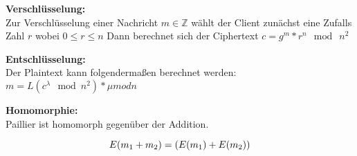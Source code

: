 \documentclass{beamer}
\begin{document}
\begin{frame}
		\textbf{Verschlüsselung:}\\
		
		
		Zur Verschlüsselung einer Nachricht $ m \in \mathbb{Z} $ wählt der Client zunächst eine Zufalls Zahl $ r $ wobei $ 0 \leq r \leq n $
		Dann berechnet sich der Ciphertext $ c = g^{m}*r^{n} \mod\ n^{2} $\
		
		\textbf{Entschlüsselung:}\\
		Der Plaintext kann folgendermaßen berechnet werden: $ m = L(c^{\lambda} \mod n^{2}) * \mu mod n $
		
		\textbf{Homomorphie:}\\
		Paillier ist homomorph gegenüber der Addition.
		
		$$ E(m \textsubscript{1} + m \textsubscript{2}) = (E(m \textsubscript{1}) + E(m \textsubscript{2}))$$
\end{frame}
\end{document}
